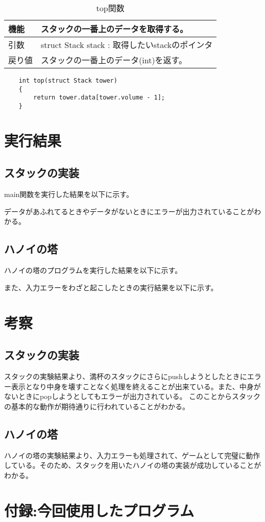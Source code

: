 \documentclass[dvipdfmx]{jsarticle}
\begin{document}
\begin{table}[ht]
  \centering
  \begin{tabular}{|p{5cm}|p{10cm}|}
    \hline
    機能  & スタックの一番上のデータを取得する。                         \\
    \hline
    引数  & struct Stack stack : 取得したいstackのポインタ \\
    \hline
    戻り値 & スタックの一番上のデータ(int)を返す。                   \\
  \end{tabular}
  \begin{lstlisting}
    int top(struct Stack tower)
    {
        return tower.data[tower.volume - 1];
    }
  \end{lstlisting}
  \caption{top関数}
  \label{tab:top_func}
\end{table}
\clearpage
\section{実行結果}
\subsection{スタックの実装}
main関数を実行した結果を以下に示す。

データがあふれてるときやデータがないときにエラーが出力されていることがわかる。
\subsection{ハノイの塔}
ハノイの塔のプログラムを実行した結果を以下に示す。

\newpage
また、入力エラーをわざと起こしたときの実行結果を以下に示す。\\


\section{考察}
\subsection{スタックの実装}
スタックの実験結果より、満杯のスタックにさらにpushしようとしたときにエラー表示となり中身を壊すことなく処理を終えることが出来ている。また、中身がないときにpopしようとしてもエラーが出力されている。
このことからスタックの基本的な動作が期待通りに行われていることがわかる。
\subsection{ハノイの塔}
ハノイの塔の実験結果より、入力エラーも処理されて、ゲームとして完璧に動作している。そのため、スタックを用いたハノイの塔の実装が成功していることがわかる。

\section{付録:今回使用したプログラム}


\end{document}
